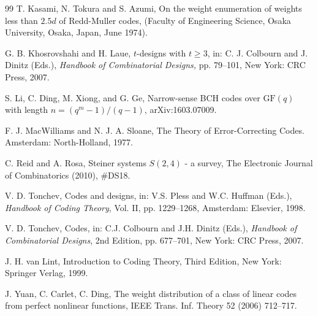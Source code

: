 \documentclass[1p,final]{elsarticle}
\newcommand{\gf}{{\mathrm{GF}}}
\begin{document}
\begin{thebibliography}{99}
 T. Kasami, N. Tokura and S. Azumi, On the weight enumeration of weights less than 
$2.5d$ of Redd-Muller codes, (Faculty of Engineering Science, Osaka University, Osaka, 
Japan, June 1974).   

 G. B. Khosrovshahi and H. Laue, $t$-designs with $t \geq 3$, in: 
C. J. Colbourn and J. Dinitz (Eds.), 
\textit{Handbook of Combinatorial Designs,} pp. 79--101, New York: CRC Press, 2007. 


 S. Li, C. Ding, M. Xiong, and G. Ge, Narrow-sense BCH codes over $\gf(q)$ with
length $n=(q^m-1)/(q-1)$,  arXiv:1603.07009.

 F. J. MacWilliams and N. J. A. Sloane, The Theory of Error-Correcting Codes. Amsterdam: North-Holland, 1977. 

 C. Reid and A. Rosa, Steiner systems $S(2, 4)$ - a survey, The Electronic Journal 
of Combinatorics (2010), \#DS18.   

  V. D. Tonchev, Codes and designs, in: V.S. Pless and W.C. Huffman (Eds.), 
\textit{Handbook of Coding Theory}, Vol. II, pp. 1229--1268, Amsterdam: Elsevier, 1998. 

 V. D. Tonchev, Codes, in: C.J. Colbourn and J.H. Dinitz (Eds.), 
\textit{Handbook of Combinatorial Designs}, 2nd Edition, pp. 677--701, New York: CRC Press, 2007.   

 J. H. van Lint, Introduction to Coding Theory, Third Edition, New York: Springer Verlag, 1999.  

 J. Yuan, C. Carlet, C. Ding, The weight distribution of a class of linear codes from perfect nonlinear functions, IEEE Trans. Inf. Theory 52 (2006)
712--717. 


\end{thebibliography}
\end{document}
